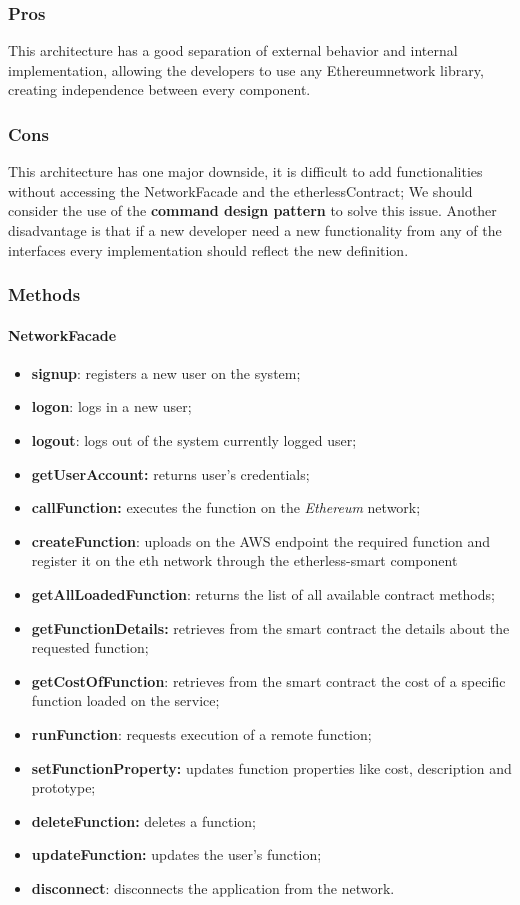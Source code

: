 \subsubsection{Pros}
This architecture has a good separation of external behavior and internal implementation,
allowing the developers to use any Ethereum\glo network library, creating independence between every component.
\subsubsection{Cons}
This architecture has one major downside, it is difficult to add functionalities without accessing the NetworkFacade and the etherlessContract; We should consider the use of the \textbf{command design pattern} to solve this issue.
Another disadvantage is that if a new developer need a new functionality from any of the interfaces every implementation should reflect the new definition.
\subsubsection{Methods}
\paragraph{NetworkFacade}
\begin{itemize}
    \item \textbf{signup}: registers a new user on the system;
    \item \textbf{logon}: logs in a new user;
    \item \textbf{logout}: logs out of the system currently logged user;
    \item \textbf{getUserAccount:} returns user's credentials;
    \item \textbf{callFunction:} executes the function on the \textit{Ethereum} network;
    \item \textbf{createFunction}: uploads on the AWS endpoint the required function and register it on the eth network through the etherless-smart component
	\item \textbf{getAllLoadedFunction}: returns the list of all available contract methods;
	\item \textbf{getFunctionDetails:} retrieves from the smart contract the details about the requested function;
	\item \textbf{getCostOfFunction}: retrieves from the smart contract the cost of a specific function loaded on the service;
	\item \textbf{runFunction}: requests execution of a remote function;
	\item \textbf{setFunctionProperty:} updates function properties like cost, description and prototype;
	\item \textbf{deleteFunction:} deletes a function;
	\item \textbf{updateFunction:} updates the user's function;    
    \item \textbf{disconnect}: disconnects the application from the network.
\end{itemize}
